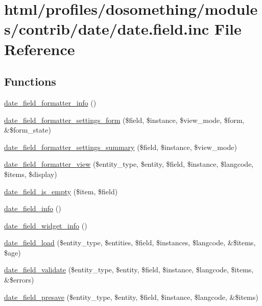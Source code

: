 \hypertarget{date_8field_8inc}{
\section{html/profiles/dosomething/modules/contrib/date/date.field.inc File Reference}
\label{date_8field_8inc}
}
\subsection*{Functions}
\begin{DoxyCompactItemize}
\item 
\hyperlink{date_8field_8inc_a41de0b573e603d7d442c261660b76855}{date\_\-field\_\-formatter\_\-info} ()
\item 
\hyperlink{date_8field_8inc_a224654ed8b7e1a260375ed74e5fc0d74}{date\_\-field\_\-formatter\_\-settings\_\-form} (\$field, \$instance, \$view\_\-mode, \$form, \&\$form\_\-state)
\item 
\hyperlink{date_8field_8inc_a10367ff3000283b8d15281b0340a318a}{date\_\-field\_\-formatter\_\-settings\_\-summary} (\$field, \$instance, \$view\_\-mode)
\item 
\hyperlink{date_8field_8inc_a054ff404fcc81a7bd9937070266c87a6}{date\_\-field\_\-formatter\_\-view} (\$entity\_\-type, \$entity, \$field, \$instance, \$langcode, \$items, \$display)
\item 
\hyperlink{date_8field_8inc_aedcb2a64f24594d3c65037e9eb2346e2}{date\_\-field\_\-is\_\-empty} (\$item, \$field)
\item 
\hyperlink{date_8field_8inc_a225438cc0aa0654ee5b8c196f0566eaf}{date\_\-field\_\-info} ()
\item 
\hyperlink{date_8field_8inc_a3985450d827612cb9e9c78297fa90cc7}{date\_\-field\_\-widget\_\-info} ()
\item 
\hyperlink{date_8field_8inc_a0d7b24400d26db6ee3792d916b76be54}{date\_\-field\_\-load} (\$entity\_\-type, \$entities, \$field, \$instances, \$langcode, \&\$items, \$age)
\item 
\hyperlink{date_8field_8inc_a0baf20c5214880496741eef3da69de79}{date\_\-field\_\-validate} (\$entity\_\-type, \$entity, \$field, \$instance, \$langcode, \$items, \&\$errors)
\item 
\hyperlink{date_8field_8inc_ac5f5698a39e9851297e225104340f307}{date\_\-field\_\-presave} (\$entity\_\-type, \$entity, \$field, \$instance, \$langcode, \&\$items)
\item 

\end{DoxyCompactItemize}
